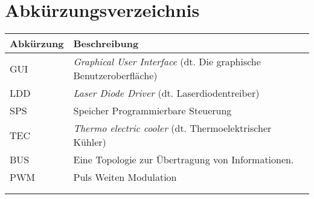 \section*{Abkürzungsverzeichnis}

\begin{table}[H]
    \begin{tabular}{l|l}
         \textbf{Abkürzung}& \textbf{Beschreibung}\\
         \hline
         GUI&   \textit{Graphical User Interface} (dt. Die graphische Benutzeroberfläche)\\
         LDD&   \textit{Laser Diode Driver} (dt. Laserdiodentreiber)\\
         SPS&   Speicher Programmierbare Steuerung\\
         TEC&   \textit{Thermo electric cooler} (dt. Thermoelektrischer Kühler)\\
         BUS&   Eine Topologie zur Übertragung von Informationen.\\
         PWM&   Puls Weiten Modulation\\
         & \\
         & \\
    \end{tabular}
    \label{tab:abkuerzungen}
\end{table}

